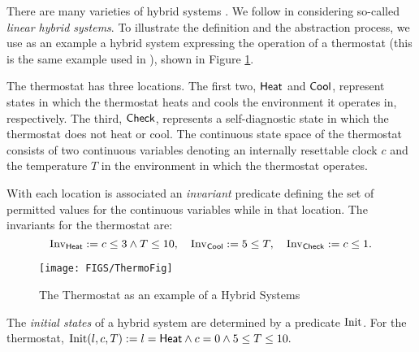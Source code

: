 \documentclass[runningheads]{llncs}
\newcommand{\weg}[1]{}
\newcommand{\Heat}{{\sf Heat}}
\newcommand{\Cool}{{\sf Cool}}
\newcommand{\Chec}{{\sf Check}}
\newcommand{\Inv}{{\rm Inv}}
\newcommand{\Init}{{\rm Init}}
\begin{document}
There are many varieties of hybrid systems \cite{henziger,lynchvaandrager}. We follow \cite{alur} in considering so-called \emph{linear hybrid systems}\weg{ (to be defined momentarily)}. To illustrate the definition and the abstraction process, we use as an example a hybrid system expressing the operation of a thermostat (this is the same example used in \cite{alur}), shown in Figure \ref{fig:thermostat}.





The thermostat has three locations. The first two, $\Heat$ and $\Cool$, represent states in which the thermostat heats and cools the environment it operates in, respectively. The third, $\Chec$, represents a self-diagnostic state in which the thermostat does not heat or cool. The continuous state space of the thermostat consists of two continuous variables denoting an internally resettable clock $c$ and the temperature $T$ in the environment in which the thermostat operates.

With each location is associated an \emph{invariant} predicate defining the set of
permitted values for the continuous variables while in that location. The invariants for the thermostat are: $$\Inv_{\Heat} := c\leq 3 \wedge T\leq 10,\quad \Inv_{\Cool} := 5 \leq T,\quad \Inv_{\Chec} := c\leq 1.$$

\begin{center}
\begin{figure}[htb!]
\begin{center}
    \texttt{[image: FIGS/ThermoFig]}
\end{center}
\caption{The Thermostat as an example of a Hybrid Systems \label{fig:thermostat}}
\end{figure}
\end{center}


The \emph{initial states} of a hybrid system are determined by a predicate $\Init$. For the thermostat,
$\Init(l,c,T) := l= \Heat \wedge c= 0 \wedge 5 \leq T \leq 10.$
\end{document}
